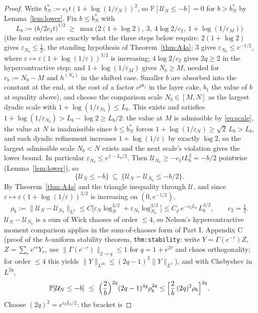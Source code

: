 \documentclass[11pt,a4paper]{article}
\theoremstyle{plain}
\theoremstyle{definition}
\newcommand{\PP}{\mathbb{P}}
\newcommand{\eps}{\varepsilon}
\newcommand{\U}{\mathcal U}
\begin{document}
\begin{proof}
Write $b_N^*:=c_1t(1+\log(1/\eps_N))^2$, so $\PP[\U_N\le-b]=0$ for
$b>b_N^*$ by Lemma~\ref{lem:lower}. Fix $b\le b_N^*$ with
\begin{equation}
 L_b:=\bigl(b/2c_1t\bigr)^{1/2}
 \ \ge\ \max\bigl(2(1+\log2),\ 3,\ 4\log2/c_2,\ 1+\log(1/\eps_{M})\bigr)
 \label{eq:scale}
\end{equation}
(the four entries are exactly what the three steps below require: $2(1+\log2)$ gives
$\eps_{N_b}\le\tfrac12$, the standing hypothesis of Theorem~\ref{thm:A4a}; $3$ gives
$\eps_{N_b}\le e^{-1/2}$, where $\eps\mapsto\eps(1+\log(1/\eps))^{3/2}$ is increasing;
$4\log2/c_2$ gives $2q\ge2$ in the hypercontractive step; and
$1+\log(1/\eps_M)$ gives $N_b\ge M$, needed for $r_b:=N_b-M$ and $h^{(N_b)}$ in the
shifted case. Smaller $b$ are absorbed into the constant at the end, at the cost of a
factor $e^{pb_1}$ in the layer cake, $b_1$ the value of $b$ at equality above), and
choose the comparison scale $N_b\in[M,N]$ as the largest
dyadic scale with $1+\log(1/\eps_{N_b})\le L_b$. This exists and satisfies
$1+\log(1/\eps_{N_b})>L_b-\log2\ge L_b/2$: the value at $M$ is admissible
by \eqref{eq:scale}, the value at $N$ is inadmissible since $b\le b_N^*$
forces $1+\log(1/\eps_N)\ge\sqrt2\,L_b>L_b$, and each dyadic refinement
increases $1+\log(1/\eps)$ by exactly $\log2$, so the largest admissible
scale $N_b<N$ exists and the next scale's violation gives the lower bound.
In particular $\eps_{N_b}\le e^{1-L_b/2}$. Then $\U_{N_b}\ge-c_1tL_b^2=-b/2$ pointwise
(Lemma~\ref{lem:lower}), so
\[
 \{\U_N\le-b\}\ \subseteq\ \{\U_N-\U_{N_b}\le-b/2\}.
\]
By Theorem~\ref{thm:A4a} and the triangle inequality through $\U$, and
since $\eps\mapsto\eps(1+\log(1/\eps))^{3/2}$ is increasing on
$(0,e^{-1/2})$,
\[
 \rho_b:=\|\U_N-\U_{N_b}\|_{L^2}
 \le C\bigl[\eps_N\log_N^{3/2}+\eps_{N_b}\log_{N_b}^{3/2}\bigr]
 \le C_\rho\,e^{-c_2L_b}\,L_b^{3/2},
 \qquad c_2=\tfrac12 .
\]
$\U_N-\U_{N_b}$ is a sum of Wick chaoses of order $\le4$, so Nelson's
hypercontractive moment comparison applies in the sum-of-chaoses form of
Part I, Appendix C (proof of the $h$-uniform stability theorem,
\texttt{thm:stability}: write $Y=\Gamma(e^{-\tau})Z$, $Z=\sum_re^{r\tau}Y_r$,
use $\|\Gamma(e^{-\tau})\|_{2\to q}\le1$ for $q=1+e^{2\tau}$ and chaos
orthogonality; for order $\le4$ this yields
$\|Y\|_{L^{2q}}\le(2q-1)^{2}\|Y\|_{L^2}$), and with Chebyshev in $L^{2q}$,
\[
 \PP[\U_N\le-b]\ \le\
 \Bigl(\frac2b\Bigr)^{2q}(2q-1)^{4q}\rho_b^{2q}
 \le\Bigl[\frac2b\,(2q)^2\rho_b\Bigr]^{2q}.
\]
Choose $(2q)^2=e^{c_2L_b/2}$: the bracket is

\end{proof}
\end{document}
